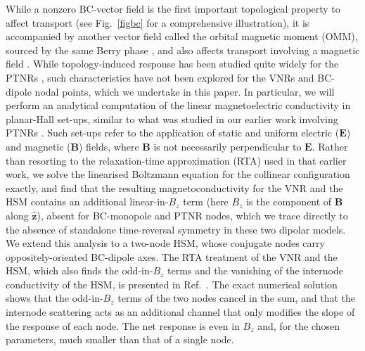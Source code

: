 \documentclass[aps,prb,onecolumn,nofootinbib,citeautoscript,10pt]{revtex4-2}
\newcommand{\bs}[1]{\boldsymbol{#1}}
\begin{document}
While a nonzero BC-vector field is the first important topological property to affect transport (see Fig.~\ref{figbc} for a comprehensive illustration), it is accompanied by another vector field called the orbital magnetic moment (OMM), sourced by the same Berry phase \cite{xiao_review, sundaram99_wavepacket}, and also affects transport involving a magnetic field \cite{ips-ruiz, ips-tilted, ips-rsw-ph, ips-shreya, ips-spin1-ph,timm, ips-exact-spin1, ips-exact-rsw, ips-exact-kwn,  ips-nlsm-ph}. While topology-induced response has been studied quite widely for the PTNRs \cite{schnyder_nodal, yang1, yang_review_nlsm, chen_nlsm, ips-magnus, flores, li2023_planar, claudia_nlsm, enke, ips-nlsm-ph}, such characteristics have not been explored for the VNRs and BC-dipole nodal points, which we undertake in this paper. In particular, we will perform an analytical computation of the linear magnetoelectric conductivity in planar-Hall set-ups, similar to what was studied in our earlier work involving PTNRs \cite{ips-nlsm-ph}. Such set-ups refer to the application of static and uniform electric ($\bs E $) and magnetic ($\bs B$) fields, where $\bs B $ is not necessarily perpendicular to $\bs E $. Rather than resorting to the relaxation-time approximation (RTA) used in that earlier work, we solve the linearised Boltzmann equation for the collinear configuration exactly, and find that the resulting magnetoconductivity for the VNR and the HSM contains an additional linear-in-$B_z$ term (here $B_z$ is the component of $\bs B$ along $\hat{\bs z}$), absent for BC-monopole and PTNR nodes, which we trace directly to the absence of standalone time-reversal symmetry in these two dipolar models. We extend this analysis to a two-node HSM, whose conjugate nodes carry oppositely-oriented BC-dipole axes. The RTA treatment of the VNR and the HSM, which also finds the odd-in-$B_z$ terms and the vanishing of the internode conductivity of the HSM, is presented in Ref.~\cite{ips-firdous-vnr}. The exact numerical solution shows that the odd-in-$B_z$ terms of the two nodes cancel in the sum, and that the internode scattering acts as an additional channel that only modifies the slope of the response of each node. The net response is even in $B_z$ and, for the chosen parameters, much smaller than that of a single node.
\end{document}
